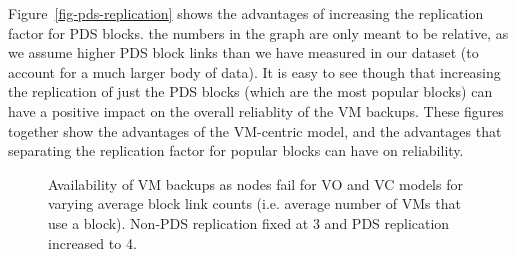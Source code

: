 Figure~\ref{fig-pds-replication}
shows the advantages of increasing the replication factor for PDS blocks. the
numbers in the graph are only meant to be relative, as we assume higher PDS
block links than we have measured in our dataset (to account for a much larger
body of data). It is easy to see though that increasing the replication of just
the PDS blocks (which are the most popular blocks) can have a positive impact
on the overall reliablity of the VM backups. These figures together show the
advantages of the VM-centric model, and the advantages that separating the
replication factor for popular blocks can have on reliability.

\begin{figure}[ht]
  \centering
  \caption{Availability of VM backups as nodes fail for VO and VC models for varying average block link counts (i.e. average number of VMs that use a block). Non-PDS replication fixed at 3 and PDS replication increased to 4.}
  \label{fig-vm-availability}
\end{figure}

